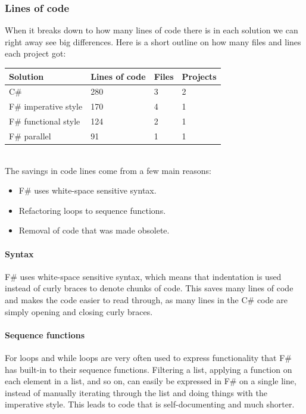 \documentclass[12pt, a4paper]{article}
\begin{document}
\newpage

\subsubsection{Lines of code}
\label{linesOfCode}
When it breaks down to how many lines of code there is in each solution we can right away see big differences. Here is a short outline on how many files and lines each project got:\\

\begin{tabular}{ |p{4cm}|p{3cm}|p{2cm}|p{3cm}|  }
 \hline
 Solution & Lines of code & Files & Projects\\
 \hline
 C\# & 280 & 3 & 2\\
 F\# imperative style & 170 & 4 & 1\\
 F\# functional style & 124 & 2 & 1\\
 F\# parallel & 91 & 1 & 1\\
 \hline
\end{tabular}\\[4mm]

The savings in code lines come from a few main reasons:
\begin{itemize}
	\item F\# uses white-space sensitive syntax.
	\item Refactoring loops to sequence functions.
	\item Removal of code that was made obsolete.
\end{itemize}

\paragraph{Syntax} F\# uses white-space sensitive syntax, which means that indentation is used instead of curly braces to denote chunks of code. This saves many lines of code and makes the code easier to read through, as many lines in the C\# code are simply opening and closing curly braces.

\paragraph{Sequence functions} For loops and while loops are very often used to express functionality that F\# has built-in to their sequence functions. Filtering a list, applying a function on each element in a list, and so on, can easily be expressed in F\# on a single line, instead of manually iterating through the list and doing things with the imperative style. This leads to code that is self-documenting and much shorter.
\end{document}
